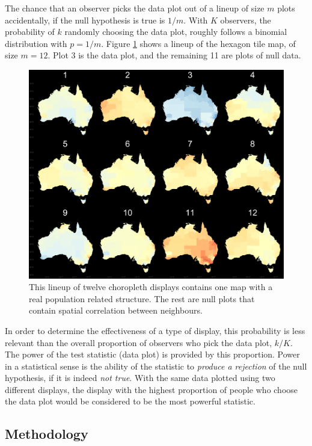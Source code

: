 \documentclass{monashthesis}
\begin{document}
The chance that an observer picks the data plot out of a lineup of size \(m\) plots accidentally, if the null hypothesis is true is \(1/m\). With \(K\) observers, the probability of \(k\) randomly choosing the data plot, roughly follows a binomial distribution with \(p=1/m\). Figure \ref{fig:lineup} shows a lineup of the hexagon tile map, of size \(m=12\). Plot 3 is the data plot, and the remaining 11 are plots of null data.

\begin{figure}[H]
\centering
\includegraphics[width=16cm]{figures/04-experiment/aus_cities_3_geo.png}
\caption{\label{fig:lineup}This lineup of twelve choropleth displays contains one map with a real population related structure. The rest are null plots that contain spatial correlation between neighbours.}
\end{figure}

In order to determine the effectiveness of a type of display, this probability is less relevant than the overall proportion of observers who pick the data plot, \(k/K\). The power of the test statistic (data plot) is provided by this proportion. Power in a statistical sense is the ability of the statistic to \emph{produce a rejection} of the null hypothesis, if it is indeed \emph{not true}. With the same data plotted using two different displays, the display with the highest proportion of people who choose the data plot would be considered to be the most powerful statistic.

\hypertarget{methodology}{%
\subsection{Methodology}\label{methodology}}
\end{document}
